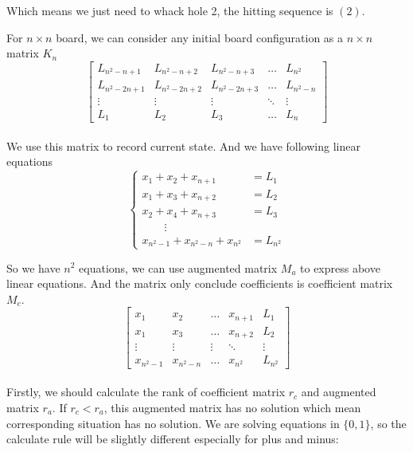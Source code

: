 \documentclass[A4,12pt]{article}
\begin{document}
\begin{enumerate}[6.]
\begin{enumerate}[8.]
\begin{enumerate}[9.]
Which means we just need to whack hole 2, the hitting sequence is $(2)$.

For $n\times n$ board, we can consider any initial board configuration as a $n\times n$ matrix $K_n$
\[ \begin{bmatrix}
L_{n^2-n+1}   & L_{n^2-n+2}   & L_{n^2-n+3}  &\ldots     &L_{n^2}   \\
L_{n^2-2n+1} & L_{n^2-2n+2} & L_{n^2-2n+3}&\ldots     &L_{n^2-n}  \\
\vdots    & \vdots      & \vdots     &\ddots     &\vdots        \\
L_1       & L_2         & L_3        &\ldots     &L_n
\end{bmatrix}
\]\\

We use this matrix to record current state. And we have following linear equations
\begin{equation}
 \left\{
 \begin{array}{lr}
 x_1+x_2+x_{n+1}&=L_1\\
 x_1+x_3+x_{n+2}&=L_2\\
 x_2+x_4+x_{n+3}&=L_3\\
 \qquad \vdots& \\
 x_{n^2-1}+x_{n^2-n}+x_{n^2}&=L_{n^2}
 \end{array}
 \right.
\end{equation}

 So we have $n^2$ equations, we can use augmented matrix $M_a$ to express above linear equations. And the matrix only conclude coefficients is coefficient matrix $M_c$.
 \[ \left[\begin{array}{cccc|c}
 x_1   & x_2 &\ldots  & x_{n+1}       &L_1             \\
 x_1 & x_3 &\ldots& x_{n+2}    &L_2                    \\
 \vdots    & \vdots     & \vdots    &\ddots  &\vdots    \\
 x_{n^2-1} & x_{n^2-n} &\ldots & x_{n^2}& L_{n^2}
 \end{array}\right]\]
 \\

Firstly, we should calculate the rank of coefficient matrix $r_c$ and augmented matrix $r_a$. If $r_c < r_a$,  this augmented matrix has no solution which mean corresponding situation has no solution. We are solving equations in $\{0,1\}$, so the calculate rule will be slightly different especially for plus and minus:\\


\end{enumerate}
\end{enumerate}
\end{enumerate}
\end{document}
